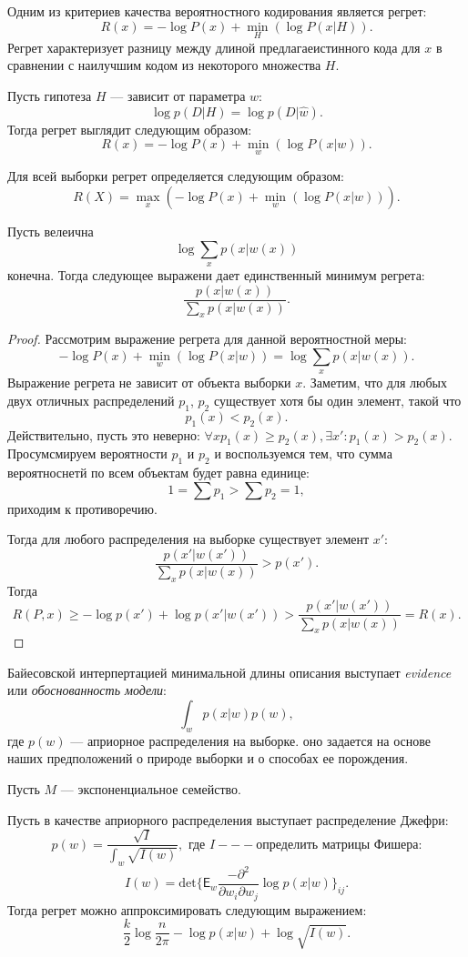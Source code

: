 \documentclass[../main.tex]{subfiles}
\begin{document}
Одним из критериев качества вероятностного кодирования является регрет:
\[
R(x) =  - \log P(x) + \min_{H} (\log P(x|H)).
\]
Регрет характеризует разницу между длиной предлагаеистинного кода для $x$ в сравнении с наилучшим кодом из некоторого множества $H$.

Пусть гипотеза $H$ --- зависит от параметра $w$:
\[
    \log p(D|H) = \log p(D|\hat{w}).    
\]
Тогда регрет выглядит следующим образом:
\[
R(x) =  - \log P(x) + \min_{w} (\log P(x|w)).
\]

Для всей выборки регрет определяется следующим образом:
\[
R(X) =  \max_{x} (- \log P(x) + \min_{w} (\log P(x|w))).
\]


\begin{theorem}
Пусть велеична
\[
    \log \sum_{x} p(x|w(x))
\]
конечна.  Тогда следующее выражени дает единственный минимум регрета:
\[
    \frac{p(x|w(x))}{\sum_{x}p(x|w(x)) }.
\]
\end{theorem}
\begin{proof}
Рассмотрим выражение регрета для данной вероятностной меры:
\[
    - \log P(x) + \min_{w} (\log P(x|w))  = \log \sum_{x} p(x|w(x)).
\]
Выражение регрета не зависит от объекта выборки $x$. 
Заметим, что для любых двух отличных распределений  $p_1$, $p_2$ существует хотя бы один элемент, такой что 
\[
    p_1(x) < p_2(x).
\]
Действительно, пусть это неверно: $\forall x p_1(x) \geq p_2(x), \exists x': p_1(x) > p_2(x)$. Просумсмируем вероятности $p_1$ и $p_2$ и воспользуемся тем, что сумма вероятноснетй по всем объектам будет равна единице:
\[
   1 =  \sum p_1  > \sum p_2 = 1,
\]
приходим к противоречию.

Тогда для любого распределения на выборке существует элемент $x'$:
\[
    \frac{p(x'|w(x'))}{\sum_{x}p(x|w(x)) } > p(x').
\]
Тогда 
\[
R(P, x)  \geq -\log p(x') + \log p(x'|w(x')) > \frac{p(x'|w(x'))}{\sum_{x}p(x|w(x)) } = R(x).
\]

\end{proof}

Байесовской интерпертацией минимальной длины описания выступает \textit{evidence} или \textit{обоснованность модели}:
\[
    \int_{w} p(x|w) p(w), 
\]
где $p(w)$ --- априорное распределения на выборке. оно задается на основе наших предположений о природе выборки и о способах ее порождения.

\begin{theorem}
Пусть $M$ --- экспоненциальное семейство. 

Пусть в качестве априорного распределения выступает распределение Джефри:
\[
    p(w) = \frac{\sqrt{I}}{\int_w \sqrt{I(w)}}, \text{ где } I --- \text{определить матрицы Фишера:}    
\]
\[
    I(w) = \text{det}\{\mathsf{E}_w \frac{-\partial^2}{\partial w_i \partial w_j } \log p(x|w) \}_{ij}.
\]
Тогда регрет можно аппроксимировать следующим выражением:
\[
\frac{k}{2}\log{\frac{n}{2\pi}} - \log p(x|w) + \log \sqrt{I(w)}.
\]
\end{theorem}
\end{document}
